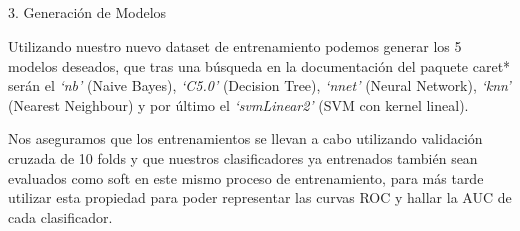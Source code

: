 \documentclass[
]{article}
\begin{document}
\subsection{}\label{section-5}

3. Generación de Modelos

Utilizando nuestro nuevo dataset de entrenamiento podemos generar los 5
modelos deseados, que tras una búsqueda en la documentación del paquete
\emph{ }caret* serán el \emph{`nb'} (Naive Bayes), \emph{`C5.0'}
(Decision Tree), \emph{`nnet'} (Neural Network), \emph{`knn'} (Nearest
Neighbour) y por último el \emph{`svmLinear2'} (SVM con kernel lineal).

Nos aseguramos que los entrenamientos se llevan a cabo utilizando
validación cruzada de 10 folds y que nuestros clasificadores ya
entrenados también sean evaluados como soft en este mismo proceso de
entrenamiento, para más tarde utilizar esta propiedad para poder
representar las curvas ROC y hallar la AUC de cada clasificador.
\end{document}
